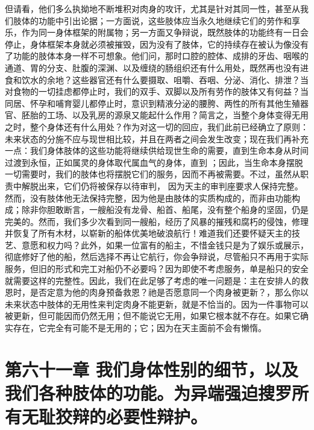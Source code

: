 但请看，他们多么执拗地不断堆积对肉身的攻讦，尤其是针对其同一性，甚至从我们肢体的功能中引出论据；一方面说，这些肢体应当永久地继续它们的劳作和享乐，作为同一身体框架的附属物；另一方面又争辩说，既然肢体的功能终有一日会停止，身体框架本身就必须被摧毁，因为没有了肢体，它的持续存在被认为像没有了功能的肢体本身一样不可想象。他们问，那时口腔的腔体、成排的牙齿、咽喉的通道、胃的分支、肚腹的深渊、以及缠绕的肠组织还有什么用处，既然再也没有进食和饮水的余地？这些器官还有什么要摄取、咀嚼、吞咽、分泌、消化、排泄？当对食物的一切挂虑都停止时，我们的双手、双脚以及所有劳作的肢体又有何益？当同居、怀孕和哺育婴儿都停止时，意识到精液分泌的腰胯、两性的所有其他生殖器官、胚胎的工场、以及乳房的源泉又能起什么作用？简言之，当整个身体变得无用之时，整个身体还有什么用处？作为对这一切的回应，我们此前已经确立了原则：未来状态的分施不应与现世相比较，并且在两者之间会发生改变；现在我们再补充一点：我们身体肢体的这些功能将继续供给现世生命的需要，直到生命本身从时间过渡到永恒，正如属灵的身体取代属血气的身体，直到  ；因此，当生命本身摆脱一切需要时，我们的肢体也将摆脱它们的服务，因而不再被需要。不过，虽然从职责中解脱出来，它们仍将被保存以待审判，  因为天主的审判座要求人保持完整。然而，没有肢体他无法保持完整，因为他是由肢体的实质构成的，而非由功能构成；除非你胆敢断言，一艘船没有龙骨、船首、船尾，没有整个船身的坚固，仍是完美的。然而，我们多少次看到同一艘船，经历了风暴的摧残和腐朽的侵蚀，修理并恢复了所有木材，以崭新的船体优美地破浪航行！难道我们还要怀疑天主的技艺、意愿和权力吗？此外，如果一位富有的船主，不惜金钱只是为了娱乐或展示，彻底修好了他的船，然后选择不再让它航行，你会争辩说，尽管船只不再用于实际服务，但旧的形式和完工对船仍不必要吗？因为即使不考虑服务，单是船只的安全就需要这样的完整性。因此，我们在此足够了考虑的唯一问题是：主在安排人的救恩时，是否定意为他的肉身预备救恩？祂是否愿意同一个肉身被更新？，那么你以未来状态中肢体的无用性来判定肉身不能更新，就是不恰当的。因为一件事物可以被更新，但可能因而仍然无用；但不能说它无用，如果它根本就不存在。如果它确实存在，它完全有可能不是无用的；它；因为在天主面前不会有懒惰。\par


\section{第六十一章 我们身体性别的细节，以及我们各种肢体的功能。为异端强迫搜罗所有无耻狡辩的必要性辩护。}

